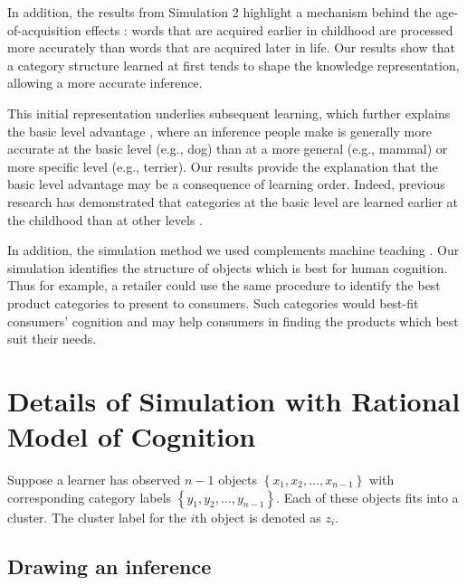 \documentclass[doc]{apa6}
\begin{document}
In addition, the results from Simulation 2 highlight a mechanism behind the age-of-acquisition
effects \parencite{Gerhand1998a, Morrison1995a}: words that are acquired earlier in childhood are
processed more accurately than words that are acquired later in life. Our results show that a
category structure learned at first tends to shape the knowledge representation, allowing a more
accurate inference.

This initial representation underlies subsequent learning, which further explains the basic level
advantage \parencite{Mervis1981a, Rosch1976a}, where an inference people make is generally more
accurate at the basic level (e.g., dog) than at a more general (e.g., mammal) or more specific level
(e.g., terrier). Our results provide the explanation that the basic level advantage may be a
consequence of learning order. Indeed, previous research has demonstrated that categories at the
basic level are learned earlier at the childhood than at other levels \parencite{Berlin1973a,
Brown1958a, Horton1980a, Mervis1982a}.

In addition, the simulation method we used complements machine teaching \parencite{Zhu2013a}. Our
simulation identifies the structure of objects which is best for human cognition. Thus for example,
a retailer could use the same procedure to identify the best product categories to present to
consumers. Such categories would best-fit consumers' cognition and may help consumers in finding the
products which best suit their needs.


\printbibliography{}

\appendix

\section{Details of Simulation with Rational Model of Cognition}
\label{appendix:model}

Suppose a learner has observed $n - 1$ objects $\left\{x_{1}, x_{2}, \dots, x_{n - 1}\right\}$ with
corresponding category labels $\left\{y_{1}, y_{2}, \dots, y_{n - 1}\right\}$.  Each of these
objects fits into a cluster. The cluster label for the $i$th object is denoted as $z_{i}$.

\subsection{Drawing an inference}
\end{document}
